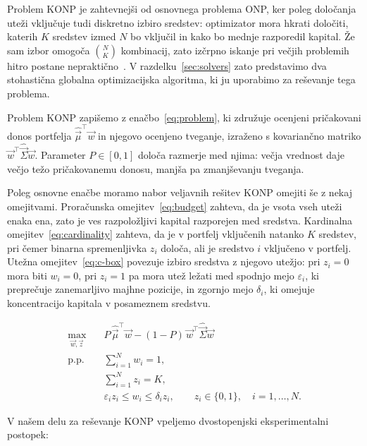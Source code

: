 \documentclass[9pt]{style/friteza}
\begin{document}
Problem KONP je zahtevnejši od osnovnega problema ONP, ker poleg določanja uteži vključuje tudi diskretno izbiro sredstev: optimizator mora hkrati določiti, katerih $K$ sredstev izmed $N$ bo vključil in kako bo mednje razporedil kapital. Že sam izbor omogoča $\binom{N}{K}$ kombinacij, zato izčrpno iskanje pri večjih problemih hitro postane nepraktično~\cite{chang2000}. V razdelku~\ref{sec:solvers} zato predstavimo dva stohastična globalna optimizacijska algoritma, ki ju uporabimo za reševanje tega problema.

Problem KONP zapišemo z enačbo~\eqref{eq:problem}, ki združuje ocenjeni pričakovani donos portfelja $\hat{\vec{\mu}}^{\top}\vec{w}$ in njegovo ocenjeno tveganje, izraženo s kovariančno matriko $\vec{w}^{\top}\hat{\vec{\Sigma}}\vec{w}$. Parameter $P\in[0,1]$ določa razmerje med njima: večja vrednost daje večjo težo pričakovanemu donosu, manjša pa zmanjševanju tveganja.

Poleg osnovne enačbe moramo nabor veljavnih rešitev KONP omejiti še z nekaj omejitvami. Proračunska omejitev~\eqref{eq:budget} zahteva, da je vsota vseh uteži enaka ena, zato je ves razpoložljivi kapital razporejen med sredstva. Kardinalna omejitev~\eqref{eq:cardinality} zahteva, da je v portfelj vključenih natanko $K$ sredstev, pri čemer binarna spremenljivka $z_i$ določa, ali je sredstvo $i$ vključeno v portfelj. Utežna omejitev~\eqref{eq:c-box} povezuje izbiro sredstva z njegovo utežjo: pri $z_i=0$ mora biti $w_i=0$, pri $z_i=1$ pa mora utež ležati med spodnjo mejo $\varepsilon_i$, ki preprečuje zanemarljivo majhne pozicije, in zgornjo mejo $\delta_i$, ki omejuje koncentracijo kapitala v posameznem sredstvu.

\begin{align}
\max_{\vec{w},\vec{z}}
\quad &
P\,\hat{\vec{\mu}}^{\top}\vec{w}
-
(1-P)\,
\vec{w}^{\top}\hat{\vec{\Sigma}}\vec{w}
\label{eq:problem}
\\
\text{p.p.}\quad
&
\sum_{i=1}^{N} w_i = 1,
\label{eq:budget}
\\
&
\sum_{i=1}^{N} z_i = K,
\label{eq:cardinality}
\\
&
\varepsilon_i z_i
\leq
w_i
\leq
\delta_i z_i,
\qquad
z_i\in\{0,1\},
\quad i=1,\dots,N.
\label{eq:c-box}
\end{align}

V našem delu za reševanje KONP vpeljemo dvostopenjski eksperimentalni postopek:
\end{document}
